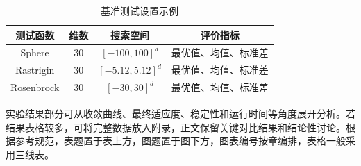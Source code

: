 \begin{table}[H]
  \centering
  \caption{基准测试设置示例}
  \label{tab:datasets}
  \begin{tabular}{cccc}
    \toprule
    测试函数 & 维数 & 搜索空间 & 评价指标 \\
    \midrule
    Sphere & 30 & $[-100,100]^d$ & 最优值、均值、标准差 \\
    Rastrigin & 30 & $[-5.12,5.12]^d$ & 最优值、均值、标准差 \\
    Rosenbrock & 30 & $[-30,30]^d$ & 最优值、均值、标准差 \\
    \bottomrule
  \end{tabular}
\end{table}

实验结果部分可从收敛曲线、最终适应度、稳定性和运行时间等角度展开分析。若结果表格较多，可将完整数据放入附录，正文保留关键对比结果和结论性讨论。根据参考规范，表题置于表上方，图题置于图下方，图表编号按章编排，表格一般采用三线表。
